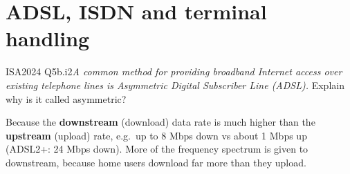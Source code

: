 \documentclass[10pt]{article}
\begin{document}
\section{ADSL, ISDN and terminal handling}

\begin{pastq}{ISA2024 Q5b.i}{2}\emph{A common method for providing broadband Internet access over existing telephone lines is Asymmetric Digital Subscriber Line (ADSL).} Explain why is it called asymmetric?\end{pastq}
\begin{ans}
Because the \textbf{downstream} (download) data rate is much higher than the \textbf{upstream} (upload) rate, e.g.\ up to 8 Mbps down vs about 1 Mbps up (ADSL2+: 24 Mbps down). More of the frequency spectrum is given to downstream, because home users download far more than they upload.
\end{ans}
\end{document}
